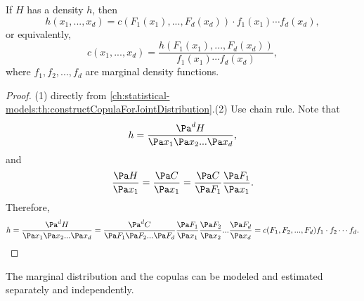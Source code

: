 \begin{refsection}
\begin{theorem}
If $H$ has a density $h$, then
$$h(x_1,...,x_d) = c(F_1(x_1),...,F_d(x_d))\cdot f_1(x_1)\cdots f_d(x_d),$$
or equivalently, 
$$c(x_1,...,x_d) = \frac{h(F_1(x_1),...,F_d(x_d))}{f_1(x_1)\cdots f_d(x_d)},$$
where $f_1,f_2,...,f_d$ are marginal density functions.
\end{theorem}
\begin{proof}
(1) directly from \autoref{ch:statistical-models:th:constructCopulaForJointDistribution}.(2) Use chain rule. Note that
$$h = \frac{\Pa^d H}{\Pa x_1\Pa x_2 ... \Pa x_d},$$
and $$\frac{\Pa H}{\Pa x_1} =\frac{\Pa C}{\Pa x_1} = \frac{\Pa C}{\Pa F_1}\frac{\Pa F_1}{\Pa x_1}.$$
Therefore, 
$$h = \frac{\Pa^d H}{\Pa x_1\Pa x_2 ... \Pa x_d} = \frac{\Pa^d C}{\Pa F_1\Pa F_2 ... \Pa F_d}\frac{\Pa F_1}{\Pa x_1}\frac{\Pa F_2}{\Pa x_2}...\frac{\Pa F_d}{\Pa x_d} = c(F_1,F_2,...,F_d)f_1\cdot f_2\cdots f_d.$$
\end{proof}

\begin{remark}
	The marginal distribution and the copulas can be modeled and estimated separately and independently. 
\end{remark}



\end{refsection}
